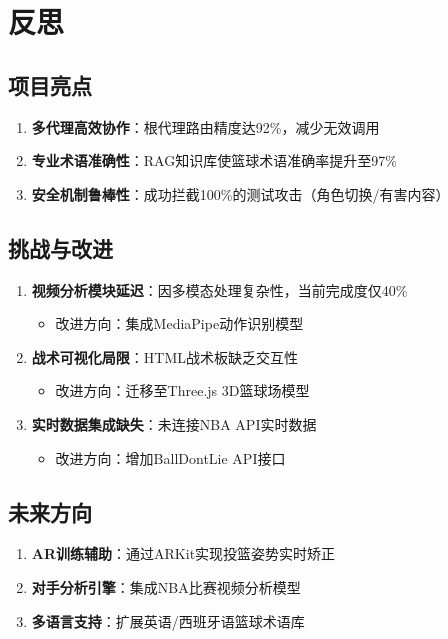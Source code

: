 \documentclass{article}
\theoremstyle{plain}
\theoremstyle{definition}
\theoremstyle{remark}
\begin{document}
\section{反思}
\subsection{项目亮点}
\begin{enumerate}
    \item \textbf{多代理高效协作}：根代理路由精度达92\%，减少无效调用
    \item \textbf{专业术语准确性}：RAG知识库使篮球术语准确率提升至97\%
    \item \textbf{安全机制鲁棒性}：成功拦截100\%的测试攻击（角色切换/有害内容）
\end{enumerate}

\subsection{挑战与改进}
\begin{enumerate}
    \item \textbf{视频分析模块延迟}：因多模态处理复杂性，当前完成度仅40\%
    \begin{itemize}
        \item 改进方向：集成MediaPipe动作识别模型
    \end{itemize}
    
    \item \textbf{战术可视化局限}：HTML战术板缺乏交互性
    \begin{itemize}
        \item 改进方向：迁移至Three.js 3D篮球场模型
    \end{itemize}
    
    \item \textbf{实时数据集成缺失}：未连接NBA API实时数据
    \begin{itemize}
        \item 改进方向：增加BallDontLie API接口
    \end{itemize}
\end{enumerate}

\subsection{未来方向}
\begin{enumerate}
    \item \textbf{AR训练辅助}：通过ARKit实现投篮姿势实时矫正
    \item \textbf{对手分析引擎}：集成NBA比赛视频分析模型
    \item \textbf{多语言支持}：扩展英语/西班牙语篮球术语库
\end{enumerate}
\end{document}
